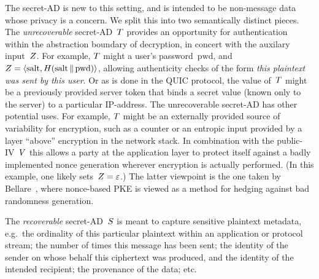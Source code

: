 The secret-AD is new to this setting, and is intended to be non-message data whose privacy is a concern.  
We split this into two semantically distinct pieces.
The \emph{unrecoverable} secret-AD~$T$ provides an opportunity for authentication within the abstraction boundary of decryption, in concert with the auxilary input~$Z$.  
For example, $T$ might a user's password~$\mathrm{pwd}$, and $Z=\langle \mathrm{salt},H(\mathrm{salt} \,\|\, \mathrm{pwd}) \rangle$, allowing authenticity checks of the form \emph{this plaintext was sent by this user}.  Or as is done in the QUIC protocol, the value of~$T$ might be a previously provided server token that binds a secret value (known only to the server) to a particular IP-address. 
%
The unrecoverable secret-AD has other potential uses.  For example, $T$ might be an externally provided source of variability for encryption, such as a counter or an entropic input provided by a layer ``above'' encryption in the network stack.  In combination with the public-IV~$V$ this allows a party at the application layer to protect itself against a badly implemented nonce generation wherever encryption is actually performed.  (In this example, one likely sets~$Z=\varepsilon$.)
The latter viewpoint is the one taken by Bellare~\cite{mihir}, where nonce-based PKE is viewed as a method for hedging against bad randomness generation.

The \emph{recoverable} secret-AD~$S$ is meant to capture sensitive plaintext metadata, e.g.\ the ordinality of this particular plaintext within an application or protocol stream; the number of times this message has been sent; the identity of the sender on whose behalf this ciphertext was produced, and the identity of the intended recipient; the provenance of the data; etc.

